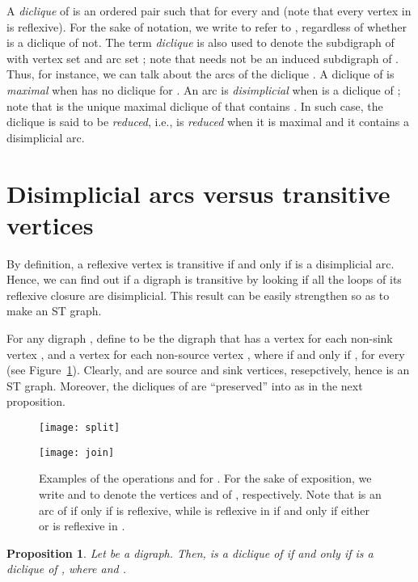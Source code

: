 \documentclass[a4paper,11pt]{article}
\newtheorem{proposition}[theorem]{Proposition}
\begin{document}
A \emph{diclique} of  is an ordered pair  such that  for every  and  (note that every vertex in  is reflexive).  For the sake of notation, we write  to refer to , regardless of whether  is a diclique of not.  The term \emph{diclique} is also used to denote the subdigraph  of  with vertex set  and arc set ; note that  needs not be an induced subdigraph of .  Thus, for instance, we can talk about the arcs of the diclique .  A diclique  of  is \emph{maximal} when  has no diclique  for .  An arc  is \emph{disimplicial} when  is a diclique of ; note that  is the unique maximal diclique of  that contains .  In such case, the diclique  is said to be \emph{reduced}, i.e.,  is \emph{reduced} when it is maximal and it contains a disimplicial arc.


\section{Disimplicial arcs versus transitive vertices}
\label{sec:disimplicial vs transitive}

By definition, a reflexive vertex  is transitive if and only if  is a disimplicial arc.  Hence, we can find out if a digraph  is transitive by looking if all the loops of its reflexive closure  are disimplicial.  This result can be easily strengthen so as to make  an ST graph.  

For any digraph , define  to be the digraph  that has a vertex  for each non-sink vertex , and a vertex  for each non-source vertex , where  if and only if , for every  (see Figure~\ref{fig:split+join}). Clearly,  and  are source and sink vertices, resepctively, hence  is an ST graph.  Moreover, the dicliques of  are ``preserved'' into  as in the next proposition.

\begin{figure}
 \centering
 \texttt{[image: split]}
 
 \texttt{[image: join]}
 \caption{Examples of the operations  and  for .  For the sake of exposition, we write  and  to denote the vertices  and  of , respectively.  Note that  is an arc of  if only if  is reflexive, while  is reflexive in  if and only if either  or  is reflexive in .}\label{fig:split+join}
\end{figure}


\begin{proposition}\label{prop:SPLIT dicliques}
  Let  be a digraph.  Then,  is a diclique of  if and only if\/  is a diclique of\/ , where\/  and\/ .
\end{proposition}
\end{document}
